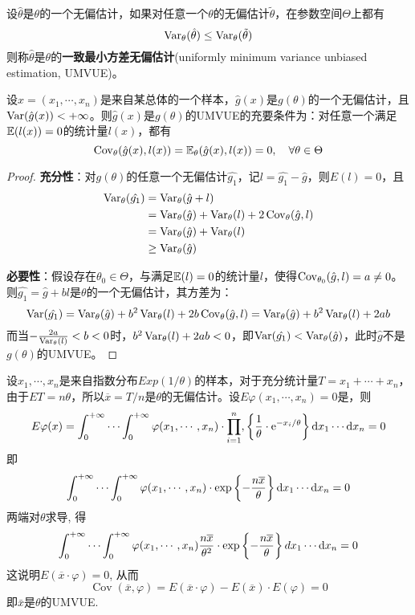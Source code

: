 \begin{definition}[一致最小方差无偏估计]\label{def:UMVUE}
    设$\hat\theta$是$\theta$的一个无偏估计，如果对任意一个$\theta$的无偏估计$\tilde\theta$，在参数空间$\Theta$上都有
    \[ \operatorname{Var}_\theta(\hat\theta) \le \operatorname{Var}_\theta(\tilde\theta) \]
    则称$\hat\theta$是$\theta$的\textbf{一致最小方差无偏估计}(uniformly minimum variance unbiased estimation, UMVUE)。
\end{definition}

\begin{theorem}[UMVUE的充要条件]
    设$x=(x_1, \cdots, x_n)$是来自某总体的一个样本，$\hat{g}(x)$是$g(\theta)$的一个无偏估计，且$\operatorname{Var}(\hat{g}(x))<+\infty$。则$\hat{g}(x)$是$g(\theta)$的UMVUE的充要条件为：对任意一个满足$\mathbb{E}(l(x))=0$的统计量$l(x)$，都有
    \[ \operatorname{Cov}_\theta(\hat{g}(x),l(x)) = \mathbb{E}_\theta(\hat{g}(x),l(x)) = 0,\quad \forall \theta \in\Theta \]
\end{theorem}
\begin{proof}
    \textbf{充分性}：对$g(\theta)$的任意一个无偏估计$\hat{g_1}$，记$l=\hat{g_1} - \hat{g}$，则$E(l)=0$，且
    \begin{align*}
        \operatorname{Var}_\theta(\hat{g_1}) &= \operatorname{Var}_\theta(\hat{g} + l) \\
        &=\operatorname{Var}_\theta(\hat{g}) + \operatorname{Var}_\theta(l) + 2\operatorname{Cov}_\theta(\hat{g},l) \\
        &=\operatorname{Var}_\theta(\hat{g}) + \operatorname{Var}_\theta(l) \\
        & \ge \operatorname{Var}_\theta(\hat{g})
    \end{align*}

    \textbf{必要性}：假设存在$\theta_0 \in \Theta$，与满足$\mathbb{E}(l)=0$的统计量$l$，使得$\operatorname{Cov}_{\theta_0}(\hat{g},l)=a \neq 0$。则$\hat{g_1}=\hat{g}+bl$是$\theta$的一个无偏估计，其方差为：
    \[ \operatorname{Var}(\hat{g_1}) = \operatorname{Var}_\theta(\hat{g}) + b^2\operatorname{Var}_\theta(l) + 2b\operatorname{Cov}_\theta(\hat{g},l)=\operatorname{Var}_\theta(\hat{g}) + b^2\operatorname{Var}_\theta(l) + 2ab \]
    而当$-\frac{2a}{\operatorname{Var}_\theta(l)}< b < 0$时，$b^2\operatorname{Var}_\theta(l) + 2ab<0$，即$\operatorname{Var}(\hat{g_1})<\operatorname{Var}_\theta(\hat{g})$，此时$\hat{g}$不是$g(\theta)$的UMVUE。
\end{proof}

\begin{example}
    设$x_1, \cdots, x_n$是来自指数分布$Exp(1/\theta)$的样本，对于充分统计量$T=x_{1}+\cdots+x_{n}$，由于$ET=n\theta$，所以$\overline{x}=T / n$是$\theta$的无偏估计。设$E\varphi\left(x_{1}, \cdots, x_{n}\right)=0$是，则
    \[ E \varphi(x)=\int_0^{+\infty} \cdots \int_0^{+\infty} \varphi(x_1, \cdots, x_n) \cdot \prod_{i=1}^n,\left\{\frac1{\theta} \cdot \mathrm e^{-x_i / \theta}\right\} \mathrm{d} x_1 \cdots \mathrm{d} x_n=0 \]
    即
    \[ \int_0^{+\infty} \cdots \int_0^{+\infty} \varphi(x_1, \cdots, x_n) \cdot \exp\left\{-\frac{n \overline{x}}{\theta}\right\} \mathrm{d} x_1 \cdots \mathrm{d} x_n=0 \]
    两端对$\theta$求导, 得
    \[ \int_0^{+\infty} \cdots \int_0^{+\infty} \varphi(x_1, \cdots, x_n) \frac{n \overline{x}}{\theta^{2}}  \cdot \exp\left\{-\frac{n \overline{x}}{\theta}\right\} \\d x_1 \cdots \mathrm{d} x_n=0 \]
    这说明$E(\overline{x} \cdot \varphi)=0$, 从而
    \[ \operatorname{Cov}(\overline{x}, \varphi)=E(\overline{x} \cdot \varphi)-E(\overline{x}) \cdot E(\varphi)=0    \]
    即$\bar x$是$\theta$的UMVUE.
\end{example}

